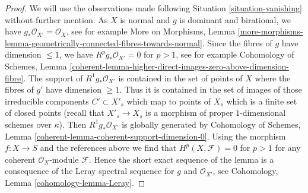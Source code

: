 \documentclass[10pt,a4paper]{amsart}
\theoremstyle{plain}
\theoremstyle{definition}
\theoremstyle{remark}
\numberwithin{equation}{subsection}
\begin{document}
\begin{proof}
We will use the observations made following Situation \ref{situation-vanishing}
without further mention. As $X$ is normal and $g$ is dominant and
birational, we have $g_*\mathcal{O}_{X'} = \mathcal{O}_X$, see for
example More on Morphisms, Lemma
\ref{more-morphisms-lemma-geometrically-connected-fibres-towards-normal}.
Since the fibres of $g$ have dimension $\leq 1$, we have
$R^pg_*\mathcal{O}_{X'} = 0$ for $p > 1$, see for example
Cohomology of Schemes, Lemma
\ref{coherent-lemma-higher-direct-images-zero-above-dimension-fibre}.
The support of $R^1g_*\mathcal{O}_{X'}$ is contained in the set of points of
$X$ where the fibres of $g'$ have dimension $\geq 1$. Thus
it is contained in the set of images of those
irreducible components $C' \subset X'_s$ which map to points of $X_s$
which is a finite set of closed points
(recall that $X'_s \to X_s$ is a morphism of proper $1$-dimensional
schemes over $\kappa$). Then $R^1g_*\mathcal{O}_{X'}$ is globally
generated by
Cohomology of Schemes, Lemma \ref{coherent-lemma-coherent-support-dimension-0}.
Using the morphism $f : X \to S$ and the references above we find that
$H^p(X, \mathcal{F}) = 0$ for $p > 1$ for any coherent $\mathcal{O}_X$-module
$\mathcal{F}$. Hence the short exact sequence of the lemma is a consequence
of the Leray spectral sequence for $g$ and $\mathcal{O}_{X'}$, see
Cohomology, Lemma \ref{cohomology-lemma-Leray}.
\end{proof}
\end{document}
